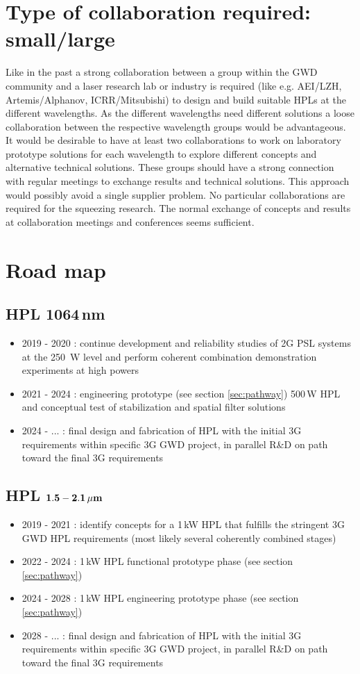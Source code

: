\section{Type of collaboration required:  small/large}
Like in the past a strong collaboration between a group within the GWD community and a laser research lab or industry is required (like e.g.  AEI/LZH, Artemis/Alphanov, ICRR/Mitsubishi) to design and build suitable HPLs at the different wavelengths. As the different wavelengths need different solutions a loose collaboration between the respective wavelength groups would be advantageous. It would be desirable to have at least two collaborations to work on laboratory prototype solutions for each wavelength to explore different concepts and alternative technical solutions. These groups should have a strong connection with regular meetings to exchange results and technical solutions. This approach would possibly avoid a single supplier problem.
No particular collaborations are required for the squeezing research. The normal exchange of concepts and results at collaboration meetings and conferences seems sufficient. 

\section{Road map}
\subsection*{HPL 1064\,nm}
\begin{itemize}
	\item 2019 - 2020 : continue development and reliability studies of 2G PSL systems at the 250\, W level and perform coherent combination demonstration experiments at high powers
	\item 2021 - 2024 : engineering prototype (see section \ref{sec:pathway}) 500\,W HPL and conceptual test of stabilization and spatial filter solutions
	\item 2024 - ... : final design and fabrication of HPL with the initial 3G requirements within specific 3G GWD project, in parallel R\&D on path toward the final 3G requirements 
\end{itemize} 


\subsection*{HPL ${\bf 1.5 - 2.1 \, {\bf \mu m}}$}
\begin{itemize}
	\item 2019 - 2021 : identify concepts for a 1\,kW HPL that fulfills the stringent 3G GWD HPL requirements (most likely several coherently combined stages)
	\item 2022 - 2024 : 1\,kW HPL functional prototype phase (see section \ref{sec:pathway})
	\item 2024 - 2028 : 1\,kW HPL engineering prototype phase (see section \ref{sec:pathway})
	\item 2028 - ... : final design and fabrication of HPL with the initial 3G requirements within specific 3G GWD project, in parallel R\&D on path toward the final 3G requirements
\end{itemize} 


